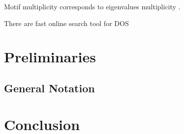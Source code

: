 \documentclass[senior,final,11pt]{iscs-thesis}
\begin{document}
Motif multiplicity corresponds to eigenvalues multiplicity \cite{mehatari2015effect,dong2019network}.

There are fast online search tool for DOS\cite{borysov2018online,geilhufe2018towards}

\chapter{Preliminaries}
\section{General Notation}

\chapter{Conclusion}

\end{document}

